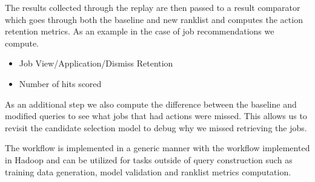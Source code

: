The results collected through the replay are then passed to a result 
comparator which goes through both the baseline and new ranklist and 
computes the action retention metrics. As an example in the case of job 
recommendations we compute. 
\begin{itemize}
\item Job View/Application/Dismiss Retention
\item Number of hits scored
\end{itemize}

As an additional step we also compute the difference between the baseline and 
modified queries to see what jobs that had actions were missed. 
This allows us to revisit the candidate selection model to debug why we 
missed retrieving the jobs. 

The workflow is implemented in a generic manner with the workflow implemented 
in Hadoop and can be utilized for tasks outside of query construction such 
as training data generation, model validation and ranklist metrics computation. 
